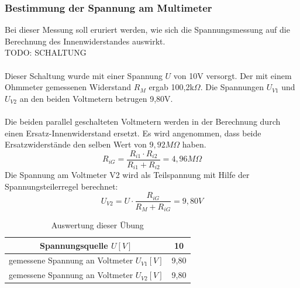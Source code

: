 \subsubsection{Bestimmung der Spannung am Multimeter}
Bei dieser Messung soll eruriert werden, wie sich die Spannungsmessung auf die Berechnung des Innenwiderstandes auswirkt.
~\\
TODO: SCHALTUNG		\\
~\\
Dieser Schaltung wurde mit einer Spannung $U$ von 10V versorgt. Der mit einem Ohmmeter gemessenen Widerstand $R_M$ ergab 100,2k$\Omega$. Die Spannungen $U_{V1}$ und $U_{V2}$ an den beiden Voltmetern betrugen 9,80V.	\\
~\\
Die beiden parallel geschalteten Voltmetern werden in der Berechnung durch einen Ersatz-Innenwiderstand ersetzt. Es wird angenommen, dass beide Ersatzwiderstände den selben Wert von $9,92 M\Omega$ haben.
\begin{equation}
	R_{iG} = \dfrac{R_{i1} \cdot R_{i2}}{R_{i1} + R_{i2}} = 4,96 M\Omega
\end{equation}
Die Spannung am Voltmeter V2 wird als Teilspannung mit Hilfe der Spannungsteilerregel berechnet:
\begin{equation}
	U_{V2} = U \cdot \dfrac{R_{iG}}{R_M + R_{iG}} = 9,80V
\end{equation}
\begin{table}[h]
	\centering
	\begin{tabular}{|c|c|}
	\hline 
	Spannungsquelle $U [V]$			& 10 		\\ 
	\hline 
	gemessene Spannung an Voltmeter $U_{V1} [V]$ 	& 9,80	\\ 
	\hline 
	gemessene Spannung an Voltmeter $U_{V2} [V]$ 	& 9,80	\\ 
	\hline 
	\end{tabular}
	\caption{Auswertung dieser Übung}
\end{table}

